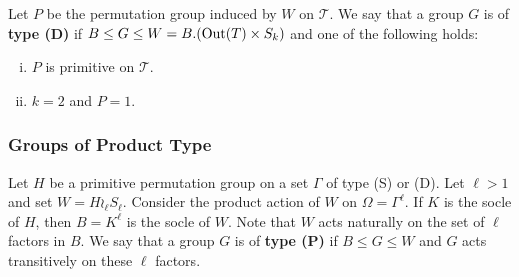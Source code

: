 Let $P$ be the permutation group induced by $W$ on $\mathcal{T}$. We say that a group $G$ is of \textbf{type (D)} if $B \leq G \leq W = B.(\operatorname{Out}(T)\times S_k)$ and one of the following holds:
\begin{enumerate}[(i)]
	\item $P$ is primitive on $\mathcal{T}$.
	\item $k=2$ and $P=1$.
\end{enumerate}

\subsubsection{Groups of Product Type}  Let $H$ be a primitive permutation group on a set $\Gamma$ of type (S) or (D). Let $\ell>1$ and set $W = H\wr_\ell S_\ell$. Consider the product action of $W$ on $\Omega = \Gamma^\ell$. If $K$ is the socle of $H$, then $B=K^\ell$ is the socle of $W$. Note that $W$ acts naturally on the set of $\ell$ factors in $B$.  We say that a group $G$ is of \textbf{type (P)} if $B\leq G\leq W$ and $G$ acts transitively on these $\ell$ factors.


